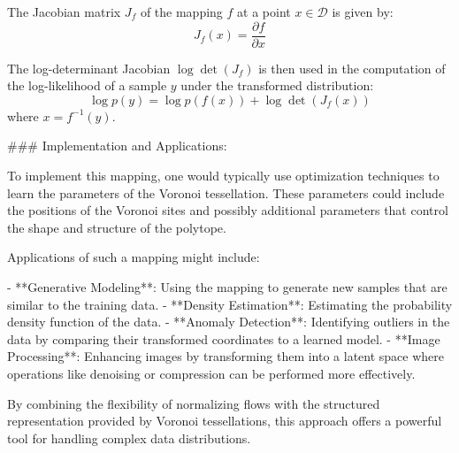The Jacobian matrix \( J_f \) of the mapping \( f \) at a point \( x \in \mathcal{D} \) is given by:
\[ J_f(x) = \frac{\partial f}{\partial x} \]

The log-determinant Jacobian \( \log \det(J_f) \) is then used in the computation of the log-likelihood of a sample \( y \) under the transformed distribution:
\[ \log p(y) = \log p(f(x)) + \log \det(J_f(x)) \]
where \( x = f^{-1}(y) \).

### Implementation and Applications:

To implement this mapping, one would typically use optimization techniques to learn the parameters of the Voronoi tessellation. These parameters could include the positions of the Voronoi sites and possibly additional parameters that control the shape and structure of the polytope.

Applications of such a mapping might include:

- **Generative Modeling**: Using the mapping to generate new samples that are similar to the training data.
- **Density Estimation**: Estimating the probability density function of the data.
- **Anomaly Detection**: Identifying outliers in the data by comparing their transformed coordinates to a learned model.
- **Image Processing**: Enhancing images by transforming them into a latent space where operations like denoising or compression can be performed more effectively.

By combining the flexibility of normalizing flows with the structured representation provided by Voronoi tessellations, this approach offers a powerful tool for handling complex data distributions.
